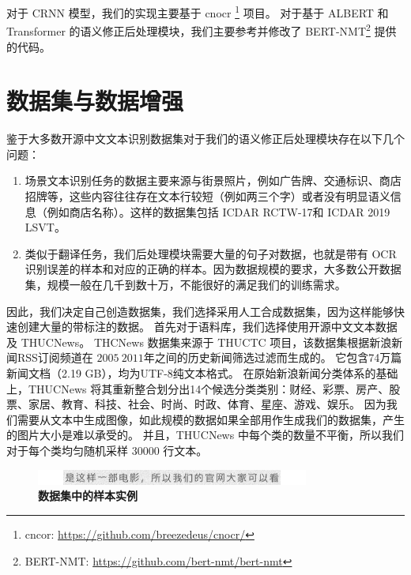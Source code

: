 对于 CRNN 模型，我们的实现主要基于 cnocr \footnote{cncor: \url{https://github.com/breezedeus/cnocr/}} 项目。
对于基于 ALBERT 和 Transformer 的语义修正后处理模块，我们主要参考并修改了 BERT-NMT\footnote{BERT-NMT: \url{https://github.com/bert-nmt/bert-nmt}} 提供的代码。


\section{数据集与数据增强}
\label{dataset}
鉴于大多数开源中文文本识别数据集对于我们的语义修正后处理模块存在以下几个问题：

\begin{enumerate}[(1)]
	\item 场景文本识别任务的数据主要来源与街景照片，例如广告牌、交通标识、商店招牌等，这些内容往往存在文本行较短（例如两三个字）或者没有明显语义信息（例如商店名称）。这样的数据集包括 ICDAR RCTW-17\cite{RCTW}和 ICDAR 2019 LSVT\cite{lsvt}。
	\item 类似于翻译任务，我们后处理模块需要大量的句子对数据，也就是带有 OCR 识别误差的样本和对应的正确的样本。因为数据规模的要求，大多数公开数据集，规模一般在几千到数十万，不能很好的满足我们的训练需求。
\end{enumerate}

因此，我们决定自己创造数据集，我们选择采用人工合成数据集，因为这样能够快速创建大量的带标注的数据。
首先对于语料库，我们选择使用开源中文文本数据及 THUCNews。
THCNews 数据集来源于 THUCTC\cite{sum2016thuctc} 项目，该数据集根据新浪新闻RSS订阅频道在 $2005~2011$年之间的历史新闻筛选过滤而生成的。
它包含74万篇新闻文档（2.19 GB），均为UTF-8纯文本格式。
在原始新浪新闻分类体系的基础上，THUCNews 将其重新整合划分出14个候选分类类别：财经、彩票、房产、股票、家居、教育、科技、社会、时尚、时政、体育、星座、游戏、娱乐。
因为我们需要从文本中生成图像，如此规模的数据如果全部用作生成我们的数据集，产生的图片大小是难以承受的。
并且，THUCNews 中每个类的数量不平衡，所以我们对于每个类均匀随机采样 $30000$ 行文本。

\begin{figure}[h!]
	\centering
	\includegraphics[width=0.8\textwidth]{figure/resources/sample.png}
	\caption{\textbf{数据集中的样本实例}\label{sample}}
\end{figure}


